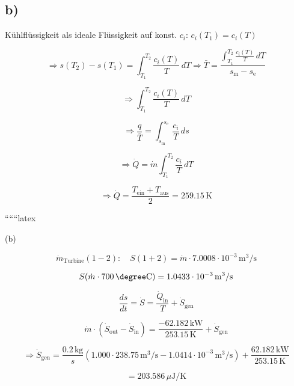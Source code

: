 

\subsection*{b)}
Kühlflüssigkeit als ideale Flüssigkeit auf konst. $c_i$: $c_i(T_1) = c_i(T)$

\[
\Rightarrow s(T_2) - s(T_1) = \int_{T_1}^{T_2} \frac{c_i(T)}{T} \, dT \Rightarrow \bar{T} = \frac{\int_{T_1}^{T_2} \frac{c_i(T)}{T} \, dT}{s_{\text{m}} - s_{\text{e}}}
\]

\[
\Rightarrow \int_{T_1}^{T_2} \frac{c_i(T)}{T} \, dT
\]

\[
\Rightarrow \frac{q}{\bar{T}} = \int_{s_{\text{m}}}^{s_{\text{e}}} \frac{c_i}{T} \, ds
\]

\[
\Rightarrow \dot{Q} = \dot{m} \int_{T_1}^{T_2} \frac{c_i}{T} \, dT
\]

\[
\Rightarrow \dot{Q} = \frac{T_{\text{ein}} + T_{\text{aus}}}{2} = 259.15 \, \text{K}
\]

``````latex

(b)

\[
\dot{m}_{\text{Turbine}} (1-2): \quad S(1+2) = \dot{m} \cdot 7.0008 \cdot 10^{-3} \, \text{m}^3/\text{s}
\]

\[
S(\dot{m} \cdot 700 \, \degree \text{C}) = 1.0433 \cdot 10^{-3} \, \text{m}^3/\text{s}
\]

\[
\frac{ds}{dt} = \dot{S} = \frac{\dot{Q}_{\text{in}}}{T} + \dot{S}_{\text{gen}}
\]

\[
\dot{m} \cdot (\dot{S}_{\text{out}} - \dot{S}_{\text{in}}) = \frac{-62.182 \, \text{kW}}{253.15 \, \text{K}} + \dot{S}_{\text{gen}}
\]

\[
\Rightarrow \dot{S}_{\text{gen}} = \frac{0.2 \, \text{kg}}{s} \left( 1.000 \cdot 238.75 \, \text{m}^3/\text{s} - 1.0414 \cdot 10^{-3} \, \text{m}^3/\text{s} \right) + \frac{62.182 \, \text{kW}}{253.15 \, \text{K}}
\]

\[
= 203.586 \, \mu \text{J}/\text{K}
\]